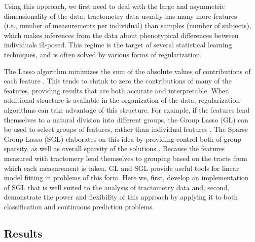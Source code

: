 \documentclass[10pt,%
               aps,%
               prl,%
               preprint,%
               superscriptaddress,%
               preprintnumbers,%
               amsmath,%
               floatfix,%
               endfloats*]{revtex4-1}
\begin{document}
Using this approach, we first need to deal with the large and
asymmetric dimensionality of the data: tractometry data usually has
many more features (i.e., number of measurements per individual) than
samples (number of subjects), which makes inferences from the data
about phenotypical differences between individuals ill-posed. This
regime is the target of several statistical learning techniques, and
is often solved by various forms of regularization.


The Lasso algorithm minimizes the sum of the absolute values of
contributions of each feature \cite{Tibshirani1996-qs}. This
tends to shrink to zero the contributions of many of the features,
providing results that are both accurate and interpretable. When
additional structure is available in the organization of the data,
regularization algorithms can take advantage of this structure. For
example, if the features lend themselves to a natural division into
different groups, the Group Lasso (GL) can be used to select groups
of features, rather than individual features \cite{Yuan2006-ky}.
The Sparse Group Lasso (SGL) elaborates on this idea by providing
control both of group sparsity, as well as overall sparsity of the
solutions \cite{simon2013sgl}. Because the features measured with
tractomery lend themselves to grouping based on the tracts from which
each measurement is taken, GL and SGL provide useful tools
for linear model fitting in problems of this form. Here we, first,
develop an implementation of SGL that is well suited to the analysis of
tractometry data and, second, demonstrate the power and flexibility of
this approach by applying it to both classification
and continuous prediction problems.

\subsection*{Results}
\end{document}
